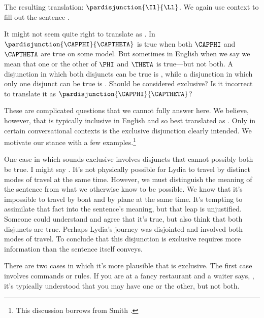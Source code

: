 \noindent{}The resulting translation: $\pardisjunction{\Il}{\Ll}$.
We again use context to fill out the sentence .  

It might not seem quite right to translate  as \mention{$\VEE$}. 
In \GSL{} $\pardisjunction{\CAPPHI}{\CAPTHETA}$ is true when both $\CAPPHI$ and $\CAPTHETA$ are true on some model. 
But sometimes in English when we say  we mean that one or the other of $\PHI$ and $\THETA$ is true---but not both. 
A disjunction in which both disjuncts can be true is , while a disjunction in which only one disjunct can be true is .
Should  be considered exclusive?
Is it incorrect to translate it as $\pardisjunction{\CAPPHI}{\CAPTHETA}$?
 
These are complicated questions that we cannot fully answer here. 
We believe, however, that  is typically inclusive in English and so best translated as \mention{$\VEE$}.
Only in certain conversational contexts is the exclusive disjunction clearly intended.
We motivate our stance with a few examples.\footnote{This discussion borrows from Smith \citeyear[117--22]{Smith2012}.}
 	
One case in which  sounds exclusive involves disjuncts that cannot possibly both be true. 
I might say . 
It's not physically possible for Lydia to travel by distinct modes of travel at the same time.
However, we must distinguish the meaning of the sentence from what we otherwise know to be possible.
We know that it's impossible to travel by boat and by plane at the same time.
It's tempting to assimilate that fact into the sentence's meaning, but that leap is unjustified. 
Someone could understand  and agree that it's true, but also think that both disjuncts are true.
Perhaps Lydia's journey was disjointed and involved both modes of travel.
To conclude that this disjunction is exclusive requires more information than the sentence itself conveys.

There are two cases in which it's more plausible that  is exclusive.  
The first case involves commands or rules. 
If you are at a fancy restaurant and a waiter says, , it's typically understood that you may have one or the other, but not both.

